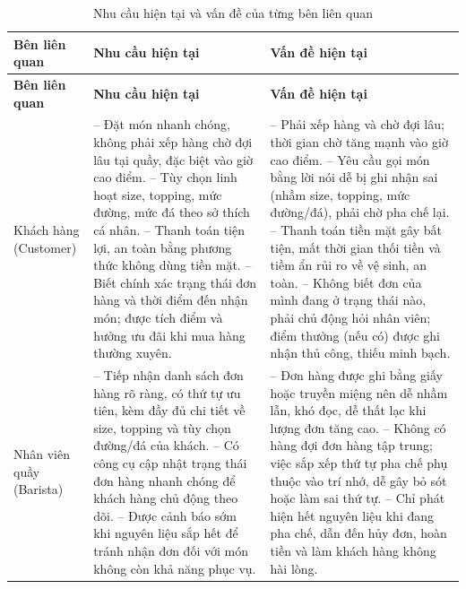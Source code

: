 \documentclass[12pt,a4paper]{report}
\begin{document}
\begin{longtable}{>{\raggedright\arraybackslash}p{3.0cm}>{\raggedright\arraybackslash}p{6.0cm}>{\raggedright\arraybackslash}p{6.0cm}}
\caption{Nhu cầu hiện tại và vấn đề của từng bên liên quan}\\
\hline
\rowcolor{gray!20} \textbf{Bên liên quan} & \textbf{Nhu cầu hiện tại} & \textbf{Vấn đề hiện tại} \\
\hline
\endfirsthead
\hline
\rowcolor{gray!20} \textbf{Bên liên quan} & \textbf{Nhu cầu hiện tại} & \textbf{Vấn đề hiện tại} \\
\hline
\endhead
Khách hàng (Customer) 
& -- Đặt món nhanh chóng, không phải xếp hàng chờ đợi lâu tại quầy, đặc biệt vào giờ cao điểm. \newline
-- Tùy chọn linh hoạt size, topping, mức đường, mức đá theo sở thích cá nhân. \newline
-- Thanh toán tiện lợi, an toàn bằng phương thức không dùng tiền mặt. \newline
-- Biết chính xác trạng thái đơn hàng và thời điểm đến nhận món; được tích điểm và hưởng ưu đãi khi mua hàng thường xuyên. 
& -- Phải xếp hàng và chờ đợi lâu; thời gian chờ tăng mạnh vào giờ cao điểm. \newline
-- Yêu cầu gọi món bằng lời nói dễ bị ghi nhận sai (nhầm size, topping, mức đường/đá), phải chờ pha chế lại. \newline
-- Thanh toán tiền mặt gây bất tiện, mất thời gian thối tiền và tiềm ẩn rủi ro về vệ sinh, an toàn. \newline
-- Không biết đơn của mình đang ở trạng thái nào, phải chủ động hỏi nhân viên; điểm thưởng (nếu có) được ghi nhận thủ công, thiếu minh bạch. \\
\hline
Nhân viên quầy (Barista) 
& -- Tiếp nhận danh sách đơn hàng rõ ràng, có thứ tự ưu tiên, kèm đầy đủ chi tiết về size, topping và tùy chọn đường/đá của khách. \newline
-- Có công cụ cập nhật trạng thái đơn hàng nhanh chóng để khách hàng chủ động theo dõi. \newline
-- Được cảnh báo sớm khi nguyên liệu sắp hết để tránh nhận đơn đối với món không còn khả năng phục vụ. 
& -- Đơn hàng được ghi bằng giấy hoặc truyền miệng nên dễ nhầm lẫn, khó đọc, dễ thất lạc khi lượng đơn tăng cao. \newline
-- Không có hàng đợi đơn hàng tập trung; việc sắp xếp thứ tự pha chế phụ thuộc vào trí nhớ, dễ gây bỏ sót hoặc làm sai thứ tự. \newline
-- Chỉ phát hiện hết nguyên liệu khi đang pha chế, dẫn đến hủy đơn, hoàn tiền và làm khách hàng không hài lòng. \newline

\end{longtable}
\end{document}
